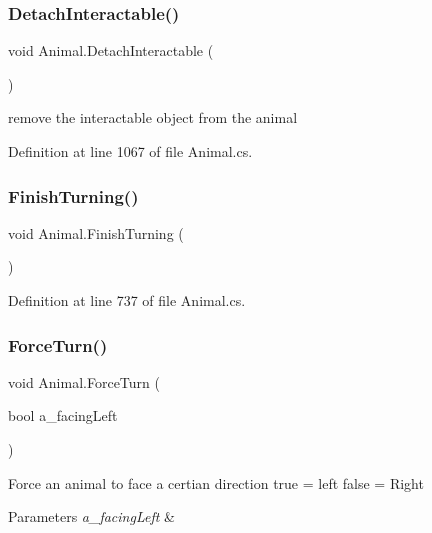 \subsubsection{\texorpdfstring{Detach\+Interactable()}{DetachInteractable()}}
{\footnotesize\ttfamily void Animal.\+Detach\+Interactable (\begin{DoxyParamCaption}{ }\end{DoxyParamCaption})}



remove the interactable object from the animal 



Definition at line 1067 of file Animal.\+cs.

\mbox{\label{class_animal_ad6e340c5c3ce2f8b2a6a94cb7bc076f3}} 
\subsubsection{\texorpdfstring{Finish\+Turning()}{FinishTurning()}}
{\footnotesize\ttfamily void Animal.\+Finish\+Turning (\begin{DoxyParamCaption}{ }\end{DoxyParamCaption})}



Definition at line 737 of file Animal.\+cs.

\mbox{\label{class_animal_adb0b40e67dde94df8dc45f9e8334b493}} 
\subsubsection{\texorpdfstring{Force\+Turn()}{ForceTurn()}}
{\footnotesize\ttfamily void Animal.\+Force\+Turn (\begin{DoxyParamCaption}\item[{bool}]{a\+\_\+facing\+Left }\end{DoxyParamCaption})}



Force an animal to face a certian direction true = left false = Right 


\begin{DoxyParams}{Parameters}
{\em a\+\_\+facing\+Left} & \\
\hline
\end{DoxyParams}



